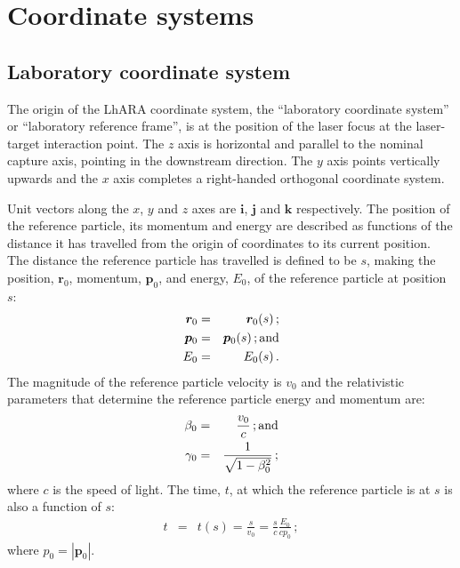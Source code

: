 \graphicspath{ {02-CoordinateSystems/Figures/} }

\section{Coordinate systems}

\subsection{Laboratory coordinate system}

The origin of the LhARA coordinate system, the ``laboratory coordinate
system'' or ``laboratory reference frame'', is at the position of the
laser focus at the laser-target interaction point.
The $z$ axis is horizontal and parallel to the nominal capture axis,
pointing in the downstream direction.
The $y$ axis points vertically upwards and the $x$ axis completes a
right-handed orthogonal coordinate system. 

Unit vectors along the $x$, $y$ and $z$ axes are $\bm{i}$, $\bm{j}$
and $\bm{k}$ respectively.
The position of the reference particle, its momentum and energy are
described as functions of the distance it has travelled from the origin
of coordinates to its current position.
The distance the reference particle has travelled is defined to be
$s$, making the position, $\bm{r}_0$, momentum, $\bm{p}_0$, and
energy, $E_0$, of the reference particle at position $s$:
\begin{eqnarray}
  \bm{r}_0 & = & \bm{r}_0(s)\, ;           \nonumber \\
  \bm{p}_0 & = & \bm{p}_0(s)\, {\rm ; and}           \\
       E_0 & = &      E_0(s)\, .           \nonumber
\end{eqnarray}
The magnitude of the reference particle velocity is $v_0$ and the
relativistic parameters that determine the reference particle energy
and momentum are:
\begin{eqnarray}
  \beta_0  & = & \frac{v_0}{c}                  \, {\rm ; and} \nonumber \\
  \gamma_0 & = & \frac{1}{\sqrt{1 - \beta^2_0}} \,; \nonumber
\end{eqnarray}
where $c$ is the speed of light.
The time, $t$, at which the reference particle is at $s$ is also a
function of $s$:
\begin{eqnarray}
        t  & = & t(s) = \frac{s}{v_0} = \frac{s}{c} \frac{E_0}{c p_0}\, ;
\end{eqnarray}
where $p_0=\left|\bm{p}_0\right|$.

